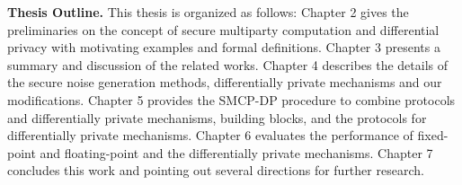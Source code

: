 \textbf{Thesis Outline.}
This thesis is organized as follows:
Chapter 2 gives the preliminaries on the concept of secure multiparty computation and differential privacy with motivating examples and formal definitions.
Chapter 3 presents a summary and discussion of the related works.
Chapter 4 describes the details of the secure noise generation methods, differentially private mechanisms and our modifications.
Chapter 5 provides the SMCP-DP procedure to combine \smpc protocols and differentially private mechanisms, building blocks, and the \smpc protocols for differentially private mechanisms.
Chapter 6 evaluates the performance of fixed-point and floating-point and the differentially private mechanisms.
Chapter 7 concludes this work and pointing out several directions for further research.


